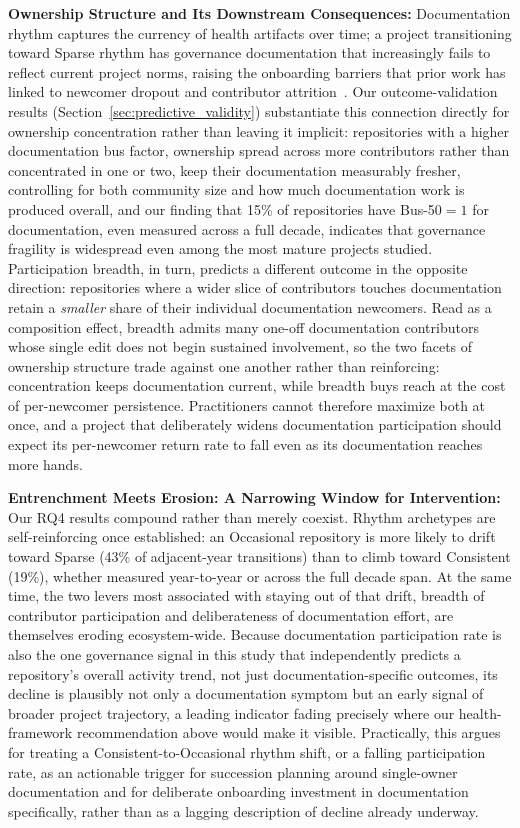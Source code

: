 \documentclass[10pt,conference]{IEEEtran}
\begin{document}
{{\noindent \textbf{Ownership Structure and Its Downstream Consequences:} Documentation rhythm captures the currency
of health artifacts over time; a project transitioning toward Sparse rhythm has governance documentation that increasingly fails to reflect current project norms, raising the onboarding barriers that prior work has linked to newcomer dropout and
contributor attrition~\cite{steinmacher2015social,steinmacher2014attracting}. Our outcome-validation results (Section~\ref{sec:predictive_validity}) substantiate this connection directly for ownership concentration rather than leaving it implicit: repositories with a higher documentation bus factor, ownership spread across more contributors rather than concentrated in one or two, keep their documentation measurably fresher, controlling for both community size and how much documentation work is produced overall, and our finding that 15\% of repositories have Bus-50$=1$ for documentation, even measured across a full decade, indicates that governance fragility is widespread even among the most mature projects studied. Participation breadth, in turn, predicts a different outcome in the opposite direction: repositories where a wider slice of contributors touches documentation retain a \textit{smaller} share of their individual documentation newcomers. Read as a composition effect, breadth admits many one-off documentation contributors whose single edit does not begin sustained involvement, so the two facets of ownership structure trade against one another rather than reinforcing: concentration keeps documentation current, while breadth buys reach at the cost of per-newcomer persistence. Practitioners cannot therefore maximize both at once, and a project that deliberately widens documentation participation should expect its per-newcomer return rate to fall even as its documentation reaches more hands.

\noindent \textbf{Entrenchment Meets Erosion: A Narrowing Window for Intervention:} Our RQ4 results compound rather than merely coexist. Rhythm archetypes are self-reinforcing once established: an Occasional repository is more likely to drift toward Sparse (43\% of adjacent-year transitions) than to climb toward Consistent (19\%), whether measured year-to-year or across the full decade span. At the same time, the two levers most associated with staying out of that drift, breadth of contributor participation and deliberateness of documentation effort, are themselves eroding ecosystem-wide. Because documentation participation rate is also the one governance signal in this study that independently predicts a repository's overall activity trend, not just documentation-specific outcomes, its decline is plausibly not only a documentation symptom but an early signal of broader project trajectory, a leading indicator fading precisely where our health-framework recommendation above would make it visible. Practically, this argues for treating a Consistent-to-Occasional rhythm shift, or a falling participation rate, as an actionable trigger for succession planning around single-owner documentation and for deliberate onboarding investment in documentation specifically, rather than as a lagging description of decline already underway.

}}
\end{document}
